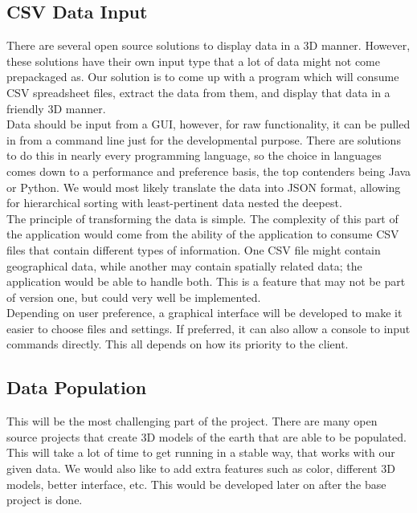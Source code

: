 \documentclass[journal,10pt,onecolumn,compsoc]{IEEEtran} \usepackage[margin=1.0in]{geometry} \usepackage{pdfpages}
\begin{document}
    \subsection{CSV Data Input}
    There are several open source solutions to display data in a 3D manner. However, these solutions have their own input type that a lot of data might not come prepackaged as. Our solution is to come up with a program which will consume CSV spreadsheet files, extract the data from them, and display that data in a friendly 3D manner. \\
    \newline
    Data should be input from a GUI, however, for raw functionality, it can be pulled in from a command line just for the developmental purpose. There are solutions to do this in nearly every programming language, so the choice in languages comes down to a performance and preference basis, the top contenders being Java or Python. We would most likely translate the data into JSON format, allowing for hierarchical sorting with least-pertinent data nested the deepest.\\
    \newline
    The principle of transforming the data is simple. The complexity of this part of the application would come from the ability of the application to consume CSV files that contain different types of information. One CSV file might contain geographical data, while another may contain spatially related data; the application would be able to handle both. This is a feature that may not be part of version one, but could very well be implemented.\\
    \newline
    Depending on user preference, a graphical interface will be developed to make it easier to choose files and settings. If preferred, it can also allow a console to input commands directly. This all depends on how its priority to the client.\\

    \subsection{Data Population}
    This will be the most challenging part of the project. There are many open source projects that create 3D models of the earth that are able to be populated. This will take a lot of time to get running in a stable way, that works with our given data. We would also like to add extra features such as color, different 3D models, better interface, etc. This would be developed later on after the base project is done.\\
\end{document}
